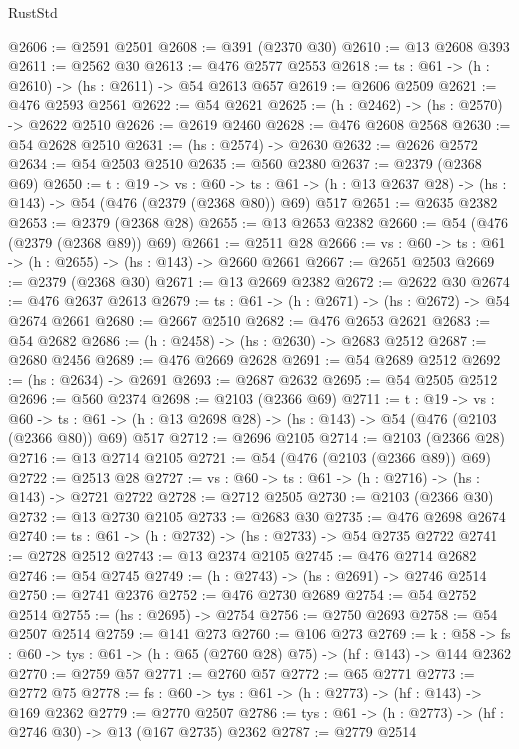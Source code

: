 \begin{lexlean}{RustStd}
\begin{coremodule}
{\begin{coremodule}
{{{{{{{@2606 := @2591 @2501
@2608 := @391 (@2370 @30)
@2610 := @13 @2608 @393
@2611 := @2562 @30
@2613 := @476 @2577 @2553
@2618 := {ts : @61} -> (h : @2610) -> (hs : @2611) -> @54 @2613 @657
@2619 := @2606 @2509
@2621 := @476 @2593 @2561
@2622 := @54 @2621
@2625 := (h : @2462) -> (hs : @2570) -> @2622 @2510
@2626 := @2619 @2460
@2628 := @476 @2608 @2568
@2630 := @54 @2628 @2510
@2631 := (hs : @2574) -> @2630
@2632 := @2626 @2572
@2634 := @54 @2503 @2510
@2635 := @560 @2380
@2637 := @2379 (@2368 @69)
@2650 := {t : @19} ->
  {vs : @60} ->
  {ts : @61} -> (h : @13 @2637 @28) -> (hs : @143) -> @54 (@476 (@2379 (@2368 @80)) @69) @517
@2651 := @2635 @2382
@2653 := @2379 (@2368 @28)
@2655 := @13 @2653 @2382
@2660 := @54 (@476 (@2379 (@2368 @89)) @69)
@2661 := @2511 @28
@2666 := {vs : @60} -> {ts : @61} -> (h : @2655) -> (hs : @143) -> @2660 @2661
@2667 := @2651 @2503
@2669 := @2379 (@2368 @30)
@2671 := @13 @2669 @2382
@2672 := @2622 @30
@2674 := @476 @2637 @2613
@2679 := {ts : @61} -> (h : @2671) -> (hs : @2672) -> @54 @2674 @2661
@2680 := @2667 @2510
@2682 := @476 @2653 @2621
@2683 := @54 @2682
@2686 := (h : @2458) -> (hs : @2630) -> @2683 @2512
@2687 := @2680 @2456
@2689 := @476 @2669 @2628
@2691 := @54 @2689 @2512
@2692 := (hs : @2634) -> @2691
@2693 := @2687 @2632
@2695 := @54 @2505 @2512
@2696 := @560 @2374
@2698 := @2103 (@2366 @69)
@2711 := {t : @19} ->
  {vs : @60} ->
  {ts : @61} -> (h : @13 @2698 @28) -> (hs : @143) -> @54 (@476 (@2103 (@2366 @80)) @69) @517
@2712 := @2696 @2105
@2714 := @2103 (@2366 @28)
@2716 := @13 @2714 @2105
@2721 := @54 (@476 (@2103 (@2366 @89)) @69)
@2722 := @2513 @28
@2727 := {vs : @60} -> {ts : @61} -> (h : @2716) -> (hs : @143) -> @2721 @2722
@2728 := @2712 @2505
@2730 := @2103 (@2366 @30)
@2732 := @13 @2730 @2105
@2733 := @2683 @30
@2735 := @476 @2698 @2674
@2740 := {ts : @61} -> (h : @2732) -> (hs : @2733) -> @54 @2735 @2722
@2741 := @2728 @2512
@2743 := @13 @2374 @2105
@2745 := @476 @2714 @2682
@2746 := @54 @2745
@2749 := (h : @2743) -> (hs : @2691) -> @2746 @2514
@2750 := @2741 @2376
@2752 := @476 @2730 @2689
@2754 := @54 @2752 @2514
@2755 := (hs : @2695) -> @2754
@2756 := @2750 @2693
@2758 := @54 @2507 @2514
@2759 := @141 @273
@2760 := @106 @273
@2769 := {k : @58} ->
  {fs : @60} -> {tys : @61} -> (h : @65 (@2760 @28) @75) -> (hf : @143) -> @144 @2362
@2770 := @2759 @57
@2771 := @2760 @57
@2772 := @65 @2771
@2773 := @2772 @75
@2778 := {fs : @60} -> {tys : @61} -> (h : @2773) -> (hf : @143) -> @169 @2362
@2779 := @2770 @2507
@2786 := {tys : @61} -> (h : @2773) -> (hf : @2746 @30) -> @13 (@167 @2735) @2362
@2787 := @2779 @2514
}}}}}}}
\end{coremodule}}
\end{coremodule}
\end{lexlean}
